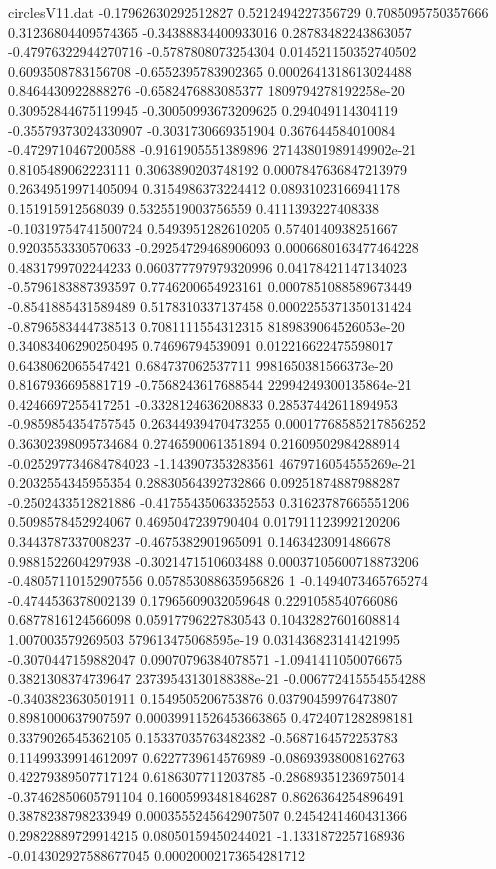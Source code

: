 \begin{filecontents}{circlesV11.dat}
-0.17962630292512827	0.5212494227356729	0.7085095750357666
0.31236804409574365	-0.34388834400933016	0.28783482243863057
-0.47976322944270716	-0.5787808073254304	0.014521150352740502
0.6093508783156708	-0.6552395783902365	0.0002641318613024488
0.8464430922888276	-0.6582476883085377	1809794278192258e-20
0.30952844675119945	-0.30050993673209625	0.294049114304119
-0.35579373024330907	-0.3031730669351904	0.367644584010084
-0.4729710467200588	-0.9161905551389896	27143801989149902e-21
0.8105489062223111	0.3063890203748192	0.0007847636847213979
0.26349519971405094	0.3154986373224412	0.08931023166941178
0.151915912568039	0.5325519003756559	0.4111393227408338
-0.10319754741500724	0.5493951282610205	0.5740140938251667
0.9203553330570633	-0.29254729468906093	0.0006680163477464228
0.4831799702244233	0.060377797979320996	0.04178421147134023
-0.5796183887393597	0.7746200654923161	0.0007851088589673449
-0.8541885431589489	0.5178310337137458	0.0002255371350131424
-0.8796583444738513	0.7081111554312315	8189839064526053e-20
0.34083406290250495	0.74696794539091	0.012216622475598017
0.6438062065547421	0.684737062537711	9981650381566373e-20
0.8167936695881719	-0.7568243617688544	22994249300135864e-21
0.4246697255417251	-0.3328124636208833	0.28537442611894953
-0.9859854354757545	0.26344939470473255	0.00017768585217856252
0.36302398095734684	0.2746590061351894	0.21609502984288914
-0.025297734684784023	-1.143907353283561	4679716054555269e-21
0.2032554345955354	0.28830564392732866	0.09251874887988287
-0.2502433512821886	-0.41755435063352553	0.31623787665551206
0.5098578452924067	0.4695047239790404	0.017911123992120206
0.3443787337008237	-0.4675382901965091	0.1463423091486678
0.9881522604297938	-0.3021471510603488	0.00037105600718873206
-0.48057110152907556	0.057853088635956826	1
-0.1494073465765274	-0.4744536378002139	0.17965609032059648
0.2291058540766086	0.6877816124566098	0.05917796227830543
0.10432827601608814	1.007003579269503	579613475068595e-19
0.031436823141421995	-0.3070447159882047	0.09070796384078571
-1.0941411050076675	0.3821308374739647	23739543130188388e-21
-0.006772415554554288	-0.3403823630501911	0.1549505206753876
0.03790459976473807	0.8981000637907597	0.00039911526453663865
0.4724071282898181	0.3379026545362105	0.15337035763482382
-0.5687164572253783	0.11499339914612097	0.6227739614576989
-0.08693938008162763	0.42279389507717124	0.6186307711203785
-0.28689351236975014	-0.37462850605791104	0.16005993481846287
0.8626364254896491	0.3878238798233949	0.0003555245642907507
0.2454241460431366	0.29822889729914215	0.08050159450244021
-1.1331872257168936	-0.014302927588677045	0.00020002173654281712

\end{filecontents}
